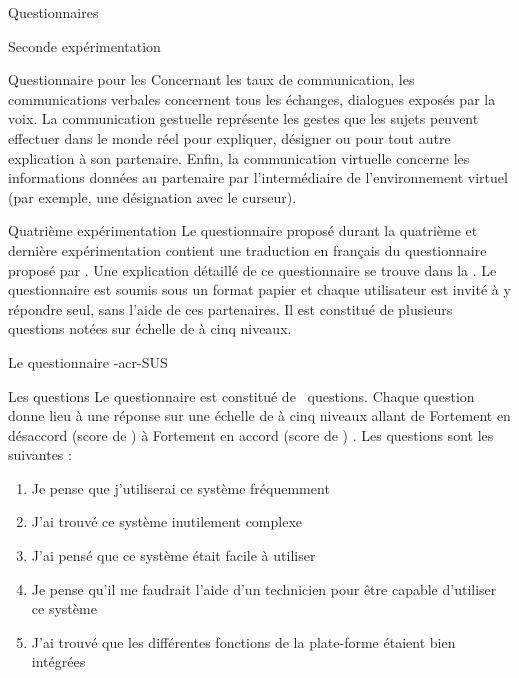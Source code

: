 \documentclass[myfrancais,ngerman,english,frenchb]{mythesis}
\begin{document}
\begin{mychapter}{Questionnaires}
\begin{mysection}{Seconde expérimentation}
\begin{mysubsection}{Questionnaire pour les }
				Concernant les taux de communication, les communications verbales concernent tous les échanges, dialogues exposés par la voix.
				La communication gestuelle représente les gestes que les sujets peuvent effectuer dans le monde réel pour expliquer, désigner ou pour tout autre explication à son partenaire.
				Enfin, la communication virtuelle concerne les informations données au partenaire par l'intermédiaire de l'environnement virtuel (par exemple, une désignation avec le curseur).
			\end{mysubsection}
		\end{mysection}
		\begin{mysection}{Quatrième expérimentation}
			Le questionnaire proposé durant la quatrième et dernière expérimentation contient une traduction en français du questionnaire  proposé par .
			Une explication détaillé de ce questionnaire se trouve dans la .
			Le questionnaire est soumis sous un format papier et chaque utilisateur est invité à y répondre seul, sans l'aide de ces partenaires.
			Il est constitué de plusieurs questions notées sur échelle de  à cinq niveaux.
			\begin{mysubsection}{Le questionnaire \myacronl-{acr-SUS}}
				\begin{mysubsubsection}{Les questions}
					Le questionnaire  est constitué de ~questions.
					Chaque question donne lieu à une réponse sur une échelle de  à cinq niveaux allant de \og Fortement en désaccord (score de ) \fg à \og Fortement en accord (score de ) \fg.
					Les questions sont les suivantes :
					\begin{enumerate}[label={Q\arabic*.},ref={Q\arabic*}]
						\item Je pense que j'utiliserai ce système fréquemment
						\item J'ai trouvé ce système inutilement complexe
						\item J'ai pensé que ce système était facile à utiliser
						\item Je pense qu'il me faudrait l'aide d'un technicien pour être capable d'utiliser ce système
						\item J'ai trouvé que les différentes fonctions de la plate-forme étaient bien intégrées

\end{enumerate}
\end{mysubsubsection}
\end{mysubsection}
\end{mysection}
\end{mychapter}
\end{document}
